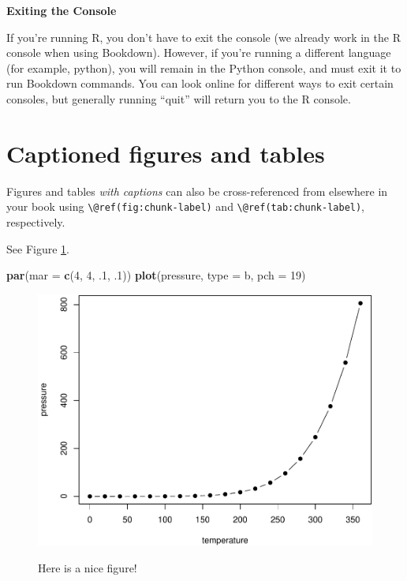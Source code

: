 \documentclass[
]{book}
\newenvironment{Shaded}{\begin{snugshade}}{\end{snugshade}}
\newcommand{\AttributeTok}[1]{\textcolor[rgb]{0.13,0.29,0.53}{#1}}
\newcommand{\DecValTok}[1]{\textcolor[rgb]{0.00,0.00,0.81}{#1}}
\newcommand{\FunctionTok}[1]{\textcolor[rgb]{0.13,0.29,0.53}{\textbf{#1}}}
\newcommand{\NormalTok}[1]{#1}
\newcommand{\StringTok}[1]{\textcolor[rgb]{0.31,0.60,0.02}{#1}}
\newenvironment{bluebox}{
  \definecolor{shadecolor}{RGB}{172, 210, 237}
  \color{white}
  \begin{shaded}}
 {\end{shaded}}
\theoremstyle{definition}
\theoremstyle{definition}
\theoremstyle{definition}
\theoremstyle{definition}
\theoremstyle{remark}
\begin{document}
\begin{bluebox}

\begin{center}
\textbf{Exiting the Console}

\end{center}

If you're running R, you don't have to exit the console (we already work in the R console when using Bookdown). However, if you're running a different language (for example, python), you will remain in the Python console, and must exit it to run Bookdown commands. You can look online for different ways to exit certain consoles, but generally running ``quit'' will return you to the R console.

\end{bluebox}

\section{Captioned figures and tables}\label{captioned-figures-and-tables}

Figures and tables \emph{with captions} can also be cross-referenced from elsewhere in your book using \texttt{\textbackslash{}@ref(fig:chunk-label)} and \texttt{\textbackslash{}@ref(tab:chunk-label)}, respectively.

See Figure \ref{fig:nice-fig}.

\begin{Shaded}
\begin{Highlighting}[]
\FunctionTok{par}\NormalTok{(}\AttributeTok{mar =} \FunctionTok{c}\NormalTok{(}\DecValTok{4}\NormalTok{, }\DecValTok{4}\NormalTok{, .}\DecValTok{1}\NormalTok{, .}\DecValTok{1}\NormalTok{))}
\FunctionTok{plot}\NormalTok{(pressure, }\AttributeTok{type =} \StringTok{\textquotesingle{}b\textquotesingle{}}\NormalTok{, }\AttributeTok{pch =} \DecValTok{19}\NormalTok{)}
\end{Highlighting}
\end{Shaded}

\begin{figure}

{\centering \includegraphics[width=0.8\linewidth,alt={Plot with connected points showing that vapor pressure of mercury increases exponentially as temperature increases.}]{_main_files/figure-latex/nice-fig-1} 

}

\caption{Here is a nice figure!}\label{fig:nice-fig}
\end{figure}
\end{document}
